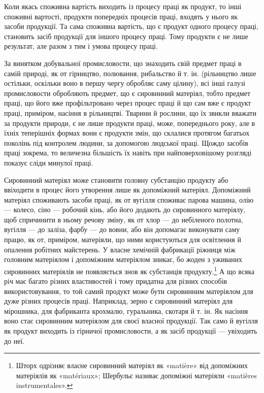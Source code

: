 Коли якась споживна вартість виходить із процесу праці як
продукт, то інші споживні вартості, продукти попередніх процесів
праці, входять у нього як засоби продукції. Та сама споживна
вартість, що є продукт одного процесу праці, становить засіб
продукції для іншого процесу праці. Тому продукти є не лише
результат, але разом з тим і умова процесу праці.

За винятком добувальної промисловости, що знаходить свій
предмет праці в самій природі, як от гірництво, полювання,
рибальство й т. ін. (рільництво лише остільки, оскільки воно в
першу чергу обробляє саму цілину), всі інші галузі промисловости
обробляють предмет, що є сировинний матеріял, тобто предмет
праці, що його вже профільтровано через процес праці й що
сам вже є продукт праці, приміром, насіння в рільництві. Тварини
й рослини, що їх звикли вважати за продукти природи, є не
лише продукти праці, може, попереднього року, але в їхніх теперішніх
формах вони є продукти змін, що склалися протягом
багатьох поколінь під контролем людини, за допомогою людської
праці. Щождо засобів праці зокрема, то величезна більшість їх
навіть при найповерховішому розгляді показує сліди минулої
праці.

Сировинний матеріял може становити головну субстанцію
продукту або ввіходити в процес його утворення лише як допоміжний
матеріял. Допоміжний матеріял споживають засоби праці,
як от вугілля споживає парова машина, олію — колесо, сіно —
робочий кінь, або його додають до сировинного матеріялу, щоб
спричинити в ньому речову зміну, як от хлор — до небіленого
полотна, вугілля — до заліза, фарбу — до вовни, або він допомагає
виконувати саму працю, як от, приміром, матеріяли, що
ними користуються для освітлення й опалення робітних майстерень.
У власне хемічній фабрикації ріжниця між головним матеріялом
і допоміжним матеріялом зникає, бо жоден з уживаних
сировинних матеріялів не появляється знов як субстанція продукту.\footnote{
Шторх одрізняє власне сировинний матеріял як «matière» від
допоміжних матеріялів як «matériaux»; Шербульє називає допоміжні
матеріяли «matières instrumentales».
}
А що всяка річ має багато різних властивостей і тому придатна
для різних способів використовування, то той самий продукт
може бути сировинним матеріялом для дуже різних процесів
праці. Наприклад, зерно є сировинний матеріял для мірошника,
для фабриканта крохмалю, гуральника, скотаря й т. ін. Як
насіння воно стає сировинним матеріялом для своєї власної продукції.
Так само й вугілля як продукт виходить із гірничої промисловости,
а як засіб продукції — увіходить до неї.

